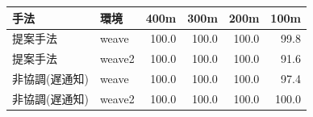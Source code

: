 \begin{tabular}{llrrrr}
\hline \hline
手法 & 環境 & 400m & 300m & 200m & 100m \\
\hline
提案手法 & weave & 100.0 & 100.0 & 100.0 & 99.8 \\
提案手法 & weave2 & 100.0 & 100.0 & 100.0 & 91.6 \\
非協調(遅通知) & weave & 100.0 & 100.0 & 100.0 & 97.4 \\
非協調(遅通知) & weave2 & 100.0 & 100.0 & 100.0 & 100.0 \\
\hline
\end{tabular}
